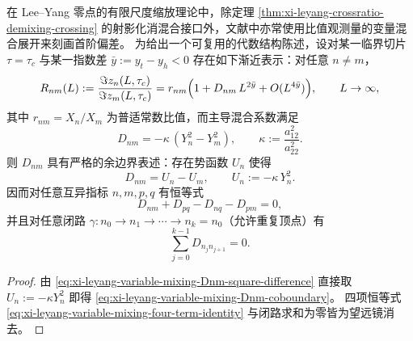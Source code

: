 \begin{proposition}\label{prop:xi-leyang-variable-mixing-coboundary}
在 Lee--Yang 零点的有限尺度缩放理论中，除定理 \ref{thm:xi-leyang-crossratio-demixing-crossing} 的射影化消混合接口外，文献中亦常使用比值观测量的变量混合展开来刻画首阶偏差。
为给出一个可复用的代数结构陈述，设对某一临界切片 \(\tau=\tau_c\) 与某一指数差
\(
\bar y:=y_t-y_h<0
\)
存在如下渐近表示：对任意 \(n\neq m\)，
\begin{equation}\label{eq:xi-leyang-imag-ratio-variable-mixing-expansion}
R_{nm}(L):=\frac{\Im z_n(L,\tau_c)}{\Im z_m(L,\tau_c)}
=r_{nm}\Bigl(1+D_{nm}\,L^{2\bar y}+O(L^{4\bar y})\Bigr),
\qquad L\to\infty,
\end{equation}
其中 \(r_{nm}=X_n/X_m\) 为普适常数比值，而主导混合系数满足
\begin{equation}\label{eq:xi-leyang-variable-mixing-Dnm-square-difference}
D_{nm}=-\kappa\,(Y_n^2-Y_m^2),
\qquad
\kappa:=\frac{a_{12}^2}{a_{22}^2}.
\end{equation}
则 \(D_{nm}\) 具有严格的余边界表述：存在势函数 \(U_n\) 使得
\begin{equation}\label{eq:xi-leyang-variable-mixing-Dnm-coboundary}
D_{nm}=U_n-U_m,
\qquad
U_n:=-\kappa\,Y_n^2.
\end{equation}
因而对任意互异指标 \(n,m,p,q\) 有恒等式
\begin{equation}\label{eq:xi-leyang-variable-mixing-four-term-identity}
D_{nm}+D_{pq}-D_{nq}-D_{pm}=0,
\end{equation}
并且对任意闭路 \(\gamma:n_0\to n_1\to\cdots\to n_k=n_0\)（允许重复顶点）有
\[
\sum_{j=0}^{k-1}D_{n_jn_{j+1}}=0.
\]
\end{proposition}
\begin{proof}
由 \eqref{eq:xi-leyang-variable-mixing-Dnm-square-difference} 直接取 \(U_n:=-\kappa Y_n^2\) 即得 \eqref{eq:xi-leyang-variable-mixing-Dnm-coboundary}。
四项恒等式 \eqref{eq:xi-leyang-variable-mixing-four-term-identity} 与闭路求和为零皆为望远镜消去。
\end{proof}

